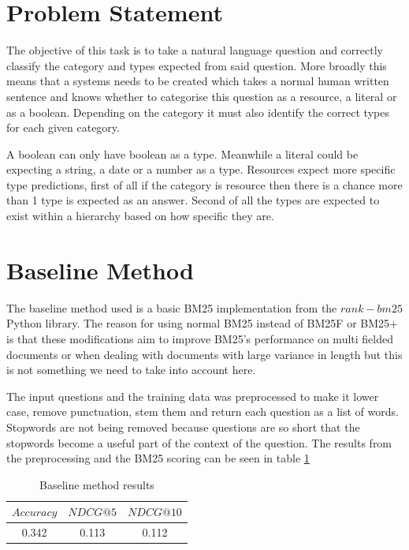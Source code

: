 \documentclass[sigconf]{acmart}
\begin{document}
\section{Problem Statement}

The objective of this task is to take a natural language question and correctly classify the category and types expected from said question. More broadly this means that a systems needs to be created which takes a normal human written sentence and knows whether to categorise this question as a resource, a literal or as a boolean. Depending on the category it must also identify the correct types for each given category. 

A boolean can only have boolean as a type. Meanwhile a literal could be expecting a string, a date or a number as a type. Resources expect more specific type predictions, first of all if the category is resource then there is a chance more than 1 type is expected as an answer. Second of all the types are expected to exist within a hierarchy based on how specific they are.



\section{Baseline Method}
The baseline method used is a basic BM25 implementation from the $rank-bm25$ Python library. The reason for using normal BM25 instead of BM25F or BM25+ is that these modifications aim to improve BM25's performance on multi fielded documents or when dealing with documents with large variance in length but this is not something we need to take into account here.

The input questions and the training data was preprocessed to make it lower case, remove punctuation, stem them and return each question as a list of words. Stopwords are not being removed because questions are so short that the stopwords become a useful part of the context of the question. The results from the preprocessing and the BM25 scoring can be seen in table \ref{tab:baseline_res}

\begin{table}[h]
    \centering
    \caption{Baseline method results}
    \begin{tabular}{c|c|c}
    $Accuracy$ & $NDCG@5$ & $NDCG@10$ \\
    \hline
    0.342 & 0.113 & 0.112
    \end{tabular}
    \label{tab:baseline_res}
\end{table}
\end{document}
